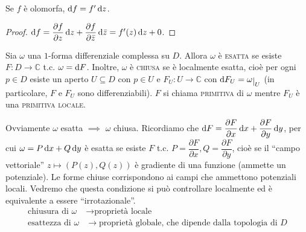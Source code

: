 \begin{cor}
  Se $f$ è olomorfa, $\mathop{}\!\mathrm{d} f=f' \mathop{}\!\mathrm{d} z$.
\end{cor}

\begin{proof}
  $\mathop{}\!\mathrm{d} f=\dfrac{\partial f}{\partial z}\mathop{}\!\mathrm{d} z+\dfrac{\partial f}{\partial \bar{z}}\mathop{}\!\mathrm{d} \bar{z}=f'(z)\mathop{}\!\mathrm{d} z+0$.
\end{proof}

\begin{defn}
  Sia $\omega$ una $1$-forma differenziale complessa su $D$. Allora $\omega$ è \textsc{esatta} se esiste $F:D \longrightarrow \mathbb{C}$ t.c. $\omega=\mathop{}\!\mathrm{d} F$.
  Inoltre, $\omega$ è \textsc{chiusa} se è localmente esatta, cioè per ogni $p \in D$ esiste un aperto $U \subseteq D$ con $p \in U$ e $F_U:U \longrightarrow \mathbb{C}$ con $\diff F_U=\omega\restrict{U}$ (in particolare, $F$ e $F_U$ sono differenziabili). $F$ si chiama \textsc{primitiva} di $\omega$ mentre $F_U$ è una \textsc{primitiva locale}.
\end{defn}

Ovviamente $\omega$ esatta $\implies$ $\omega$ chiusa. Ricordiamo che $\mathop{}\!\mathrm{d} F=\dfrac{\partial F}{\partial x}\mathop{}\!\mathrm{d} x+\dfrac{\partial F}{\partial y}\mathop{}\!\mathrm{d} y$, per cui $\omega=P\mathop{}\!\mathrm{d} x+Q\mathop{}\!\mathrm{d} y$ è esatta se esiste $F$ t.c. $P=\dfrac{\partial F}{\partial x}, Q=\dfrac{\partial F}{\partial y}$, cioè se il ``campo vettoriale'' $z \longmapsto (P(z), Q(z))$ è gradiente di una funzione (ammette un potenziale).
Le forme chiuse corrispondono ai campi che ammettono potenziali locali. Vedremo che questa condizione si può controllare localmente ed è equivalente a essere ``irrotazionale''.
\begin{align*}
  \text{chiusura di } \omega &\longrightarrow \text{proprietà locale}\\
  \text{esattezza di } \omega &\longrightarrow \text{proprietà globale, che dipende dalla topologia di $D$}
\end{align*}
